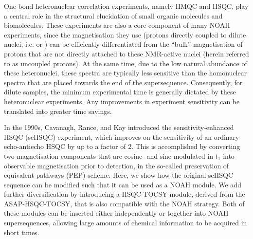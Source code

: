 \documentclass[11pt]{article}
\newcommand*{\carbon}{\ce{^{13}C}}
\newcommand*{\nitrogen}{\ce{^{15}N}}
\begin{document}
One-bond heteronuclear correlation experiments, namely HMQC and HSQC, play a central role in the structural elucidation of small organic molecules and biomolecules.\autocite{textbooks}
These experiments are also a core component of many NOAH experiments, since the magnetisation they use (protons directly coupled to dilute nuclei, i.e. \carbon{} or \nitrogen{}) can be efficiently differentiated from the ``bulk'' magnetisation of protons that are not directly attached to these NMR-active nuclei (herein referred to as uncoupled protons).\autocite{Garbow1982CPL, Kupce2019JMR}
At the same time, due to the low natural abundance of these heteronuclei, these spectra are typically less sensitive than the homonuclear spectra that are placed towards the end of the supersequence.
Consequently, for dilute samples, the minimum experimental time is generally dictated by these heteronuclear experiments.
Any improvements in experiment sensitivity can be translated into greater time savings.

In the 1990s, Cavanagh, Rance, and Kay introduced the sensitivity-enhanced HSQC (seHSQC) experiment, which improves on the sensitivity of an ordinary echo-antiecho HSQC by up to a factor of 2.\autocite{sehsqc}
This is accomplished by converting two magnetisation components that are cosine- and sine-modulated in $t_1$ into observable magnetisation prior to detection, in the so-called preservation of equivalent pathways (PEP) scheme.
Here, we show how the original seHSQC sequence can be modified such that it can be used as a NOAH module.
We add further diversification by introducing a HSQC-TOCSY module, derived from the ASAP-HSQC-TOCSY,\autocite{Becker2019JMR} that is also compatible with the NOAH strategy.
Both of these modules can be inserted either independently or together into NOAH supersequences, allowing large amounts of chemical information to be acquired in short times.


\end{document}
